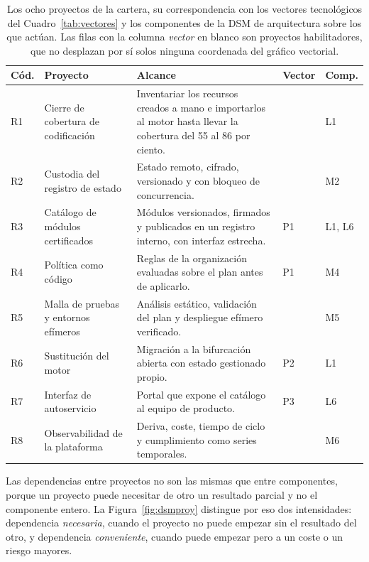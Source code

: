 \documentclass[11pt,letterpaper]{article}
\begin{document}
\begin{table}[ht]
  \centering
  \footnotesize
  \caption{Los ocho proyectos de la cartera, su correspondencia con los
  vectores tecnológicos del Cuadro~\ref{tab:vectores} y los componentes de la
  DSM de arquitectura sobre los que actúan. Las filas con la columna
  \emph{vector} en blanco son proyectos habilitadores, que no desplazan por sí
  solos ninguna coordenada del gráfico vectorial.}
  \label{tab:dsmproy}
  \begin{tabularx}{\textwidth}{@{}l>{\raggedright\arraybackslash}p{}
    >{\raggedright\arraybackslash}X l l@{}}
    \toprule
    \textbf{Cód.} & \textbf{Proyecto} & \textbf{Alcance} & \textbf{Vector} &
      \textbf{Comp.} \\
    \midrule
    R1 & Cierre de cobertura de codificación & Inventariar los recursos
         creados a mano e importarlos al motor hasta llevar la cobertura del
         55 al 86 por ciento. & & L1 \\
    R2 & Custodia del registro de estado & Estado remoto, cifrado, versionado
         y con bloqueo de concurrencia. & & M2 \\
    R3 & Catálogo de módulos certificados & Módulos versionados, firmados y
         publicados en un registro interno, con interfaz estrecha. & P1 &
         L1, L6 \\
    R4 & Política como código & Reglas de la organización evaluadas sobre el
         plan antes de aplicarlo. & P1 & M4 \\
    R5 & Malla de pruebas y entornos efímeros & Análisis estático, validación
         del plan y despliegue efímero verificado. & & M5 \\
    R6 & Sustitución del motor & Migración a la bifurcación abierta con
         estado gestionado propio. & P2 & L1 \\
    R7 & Interfaz de autoservicio & Portal que expone el catálogo al equipo
         de producto. & P3 & L6 \\
    R8 & Observabilidad de la plataforma & Deriva, coste, tiempo de ciclo y
         cumplimiento como series temporales. & & M6 \\
    \bottomrule
  \end{tabularx}
\end{table}

Las dependencias entre proyectos no son las mismas que entre componentes,
porque un proyecto puede necesitar de otro un resultado parcial y no el
componente entero. La Figura~\ref{fig:dsmproy} distingue por eso dos
intensidades: dependencia \emph{necesaria}, cuando el proyecto no puede
empezar sin el resultado del otro, y dependencia \emph{conveniente}, cuando
puede empezar pero a un coste o un riesgo mayores.
\end{document}
